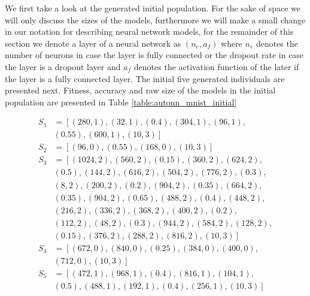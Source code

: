 \documentclass[journal]{IEEEtran}
\begin{document}
We first take a look at the generated initial population. For the sake of space we will only discuss the sizes of the models, furthermore we will make a small change in our notation for describing neural network models, for the remainder of this section we denote a layer of a neural network as $(n_e, a_f)$ where $n_e$ denotes the number of neurons in case the layer is fully connected or the dropout rate in case the layer is a dropout layer and $a_f$ denotes the activation function of the later if the layer is a fully connected layer. The initial five generated individuals are presented next. Fitness, accuracy and raw size of the models in the initial population are presented in Table \ref{table:autonn_mnist_initial}

\begin{align*}
S_1 & = \left[ (280, 1), (32, 1), (0.4), (304, 1), (96, 1), \right.\\
& \left. (0.55), (600, 1), (10, 3) \right] \\
S_2 & = \left[ (96, 0), (0.55), (168, 0), (10, 3) \right] \\
S_3 & = \left[ (1024, 2), (560, 2), (0.15), (360, 2), (624, 2), \right.\\
& \left. (0.5), (144, 2), (616, 2), (504, 2), (776, 2), (0.3), \right.\\ 
& \left. (8, 2), (200, 2), (0.2), (904, 2), (0.35), (664, 2), \right.\\ 
& \left. (0.35), (904, 2), (0.65), (488, 2), (0.4), (448, 2), \right.\\
& \left. (216, 2), (336, 2), (368, 2), (400, 2), (0.2), \right.\\
& \left. (112, 2), (48, 2), (0.3), (944, 2), (584, 2), (128, 2), \right.\\
& \left. (0.15), (376, 2), (288, 2), (816, 2), (10, 3) \right] \\
S_4 & = \left[ (672, 0), (840, 0), (0.25), (384, 0), (400, 0), \right.\\
& \left. (712, 0), (10, 3) \right] \\
S_5 & = \left[ (472, 1), (968, 1), (0.4), (816, 1), (104, 1), \right.\\
& \left. (0.5), (488, 1), (192, 1), (0.4), (256, 1), (10, 3) \right] \\
\end{align*}

\end{document}
